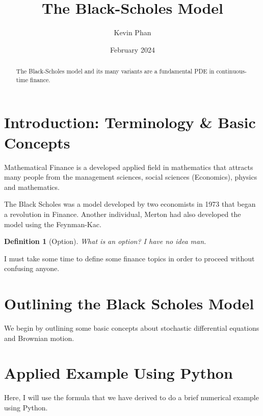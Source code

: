 \documentclass{article}
\title{The Black-Scholes Model}
\author{Kevin Phan}
\date{February 2024}
\newtheorem{definition}{Definition}[section]
\begin{document}
\maketitle

\begin{abstract}
    The Black-Scholes model and its many variants are a fundamental PDE in continuous-time finance. 
\end{abstract}

\section{Introduction: Terminology \& Basic Concepts}

Mathematical Finance is a developed applied field in mathematics that attracts many people from the management sciences, social sciences (Economics), physics and mathematics.

The Black Scholes was a model developed by two economists in 1973 that began a revolution in Finance.
Another individual, Merton had also developed the model using the Feynman-Kac. 
 
\begin{definition}[Option]
What is an option? I have no idea man.
\end{definition}

I must take some time to define some finance topics in order to proceed without confusing anyone.



\section{Outlining the Black Scholes Model}
We begin by outlining some basic concepts about stochastic differential equations and Brownian motion. 

\section{Applied Example Using Python}

Here, I will use the formula that we have derived to do a brief numerical example using Python.
\end{document}

